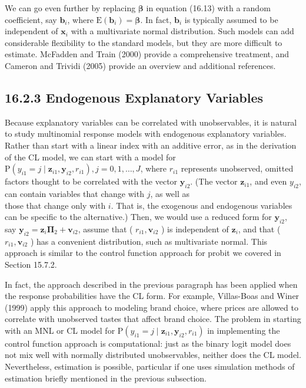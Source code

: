 \documentclass[10pt]{article}
\begin{document}
We can go even further by replacing $\boldsymbol{\beta}$ in equation (16.13) with a random coefficient, say $\mathbf{b}_{i}$, where $\mathrm{E}\left(\mathbf{b}_{i}\right)=\boldsymbol{\beta}$. In fact, $\mathbf{b}_{i}$ is typically assumed to be independent of $\mathbf{x}_{i}$ with a multivariate normal distribution. Such models can add considerable flexibility to the standard models, but they are more difficult to estimate. McFadden and Train (2000) provide a comprehensive treatment, and Cameron and Trividi (2005) provide an overview and additional references.

\subsection*{16.2.3 Endogenous Explanatory Variables}
Because explanatory variables can be correlated with unobservables, it is natural to study multinomial response models with endogenous explanatory variables. Rather than start with a linear index with an additive error, as in the derivation of the CL model, we can start with a model for $\mathrm{P}\left(y_{i 1}=j \mid \mathbf{z}_{i 1}, \mathbf{y}_{i 2}, r_{i 1}\right), j=0,1, \ldots, J$, where $r_{i 1}$ represents unobserved, omitted factors thought to be correlated with the vector $\mathbf{y}_{i 2}$. (The vector $\mathbf{z}_{i 1}$, and even $y_{i 2}$, can contain variables that change with $j$, as well as\\
those that change only with $i$. That is, the exogenous and endogenous variables can be specific to the alternative.) Then, we would use a reduced form for $\mathbf{y}_{i 2}$, say $\mathbf{y}_{i 2}= \mathbf{z}_{i} \boldsymbol{\Pi}_{2}+\mathbf{v}_{i 2}$, assume that ( $r_{i 1}, \mathbf{v}_{i 2}$ ) is independent of $\mathbf{z}_{i}$, and that ( $r_{i 1}, \mathbf{v}_{i 2}$ ) has a convenient distribution, such as multivariate normal. This approach is similar to the control function approach for probit we covered in Section 15.7.2.

In fact, the approach described in the previous paragraph has been applied when the response probabilities have the CL form. For example, Villas-Boas and Winer (1999) apply this approach to modeling brand choice, where prices are allowed to correlate with unobserved tastes that affect brand choice. The problem in starting with an MNL or CL model for $\mathrm{P}\left(y_{i 1}=j \mid \mathbf{z}_{i 1}, \mathbf{y}_{i 2}, r_{i 1}\right)$ in implementing the control function approach is computational: just as the binary logit model does not mix well with normally distributed unobservables, neither does the CL model. Nevertheless, estimation is possible, particular if one uses simulation methods of estimation briefly mentioned in the previous subsection.
\end{document}
